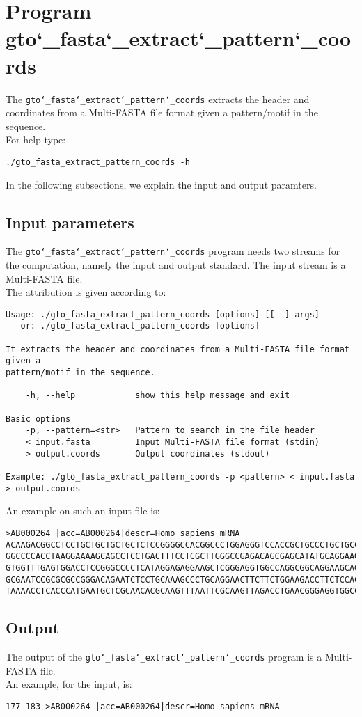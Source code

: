 \section{Program gto\char`_fasta\char`_extract\char`_pattern\char`_coords}
The \texttt{gto\char`_fasta\char`_extract\char`_pattern\char`_coords} extracts the header and coordinates from a Multi-FASTA file format given a pattern/motif in the sequence. \\
For help type:
\begin{lstlisting}
./gto_fasta_extract_pattern_coords -h
\end{lstlisting}
In the following subsections, we explain the input and output paramters.

\subsection*{Input parameters}

The \texttt{gto\char`_fasta\char`_extract\char`_pattern\char`_coords} program needs two streams for the computation, namely the input and output standard. The input stream is a Multi-FASTA  file.\\
The attribution is given according to:
\begin{lstlisting}
Usage: ./gto_fasta_extract_pattern_coords [options] [[--] args]
   or: ./gto_fasta_extract_pattern_coords [options]

It extracts the header and coordinates from a Multi-FASTA file format given a 
pattern/motif in the sequence.

    -h, --help            show this help message and exit

Basic options
    -p, --pattern=<str>   Pattern to search in the file header
    < input.fasta         Input Multi-FASTA file format (stdin)
    > output.coords       Output coordinates (stdout)

Example: ./gto_fasta_extract_pattern_coords -p <pattern> < input.fasta > output.coords
\end{lstlisting}
An example on such an input file is:
\begin{lstlisting}
>AB000264 |acc=AB000264|descr=Homo sapiens mRNA 
ACAAGACGGCCTCCTGCTGCTGCTGCTCTCCGGGGCCACGGCCCTGGAGGGTCCACCGCTGCCCTGCTGCCATTGTCCCC
GGCCCCACCTAAGGAAAAGCAGCCTCCTGACTTTCCTCGCTTGGGCCGAGACAGCGAGCATATGCAGGAAGCGGCAGGAA
GTGGTTTGAGTGGACCTCCGGGCCCCTCATAGGAGAGGAAGCTCGGGAGGTGGCCAGGCGGCAGGAAGCAGGCCAGTGCC
GCGAATCCGCGCGCCGGGACAGAATCTCCTGCAAAGCCCTGCAGGAACTTCTTCTGGAAGACCTTCTCCACCCCCCCAGC
TAAAACCTCACCCATGAATGCTCGCAACACGCAAGTTTAATTCGCAAGTTAGACCTGAACGGGAGGTGGCCACGCAAGTT
\end{lstlisting}

\subsection*{Output}
The output of the \texttt{gto\char`_fasta\char`_extract\char`_pattern\char`_coords} program is a Multi-FASTA  file.\\
An example, for the input, is:
\begin{lstlisting}
177	183	>AB000264 |acc=AB000264|descr=Homo sapiens mRNA 
\end{lstlisting}
